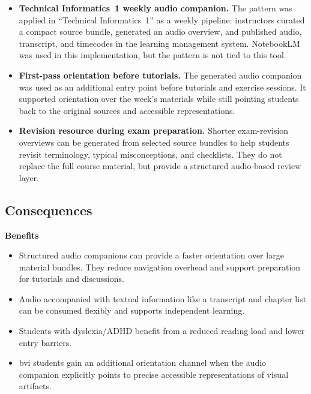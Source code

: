 \begin{itemize}
    \item \textbf{Technical Informatics~1 weekly audio companion.}
    The pattern was applied in ``Technical Informatics~1'' as a weekly pipeline: instructors curated a compact source bundle, generated an audio overview, and published audio, transcript, and timecodes in the learning management system. NotebookLM was used in this implementation, but the pattern is not tied to this tool.

    \item \textbf{First-pass orientation before tutorials.}
    The generated audio companion was used as an additional entry point before tutorials and exercise sessions. It supported orientation over the week's materials while still pointing students back to the original sources and accessible representations.

    \item \textbf{Revision resource during exam preparation.}
    Shorter exam-revision overviews can be generated from selected source bundles to help students revisit terminology, typical misconceptions, and checklists. They do not replace the full course material, but provide a structured audio-based review layer.
\end{itemize}

\subsection*{Consequences}

\noindent\textbf{Benefits}
\begin{itemize}
    \item[$+$] Structured audio companions can provide a faster orientation over large material bundles. They reduce navigation overhead and support preparation for tutorials and discussions.
    \item[$+$] Audio accompanied with textual information like a transcript and chapter list can be consumed flexibly and supports independent learning.
    \item[$+$] Students with dyslexia/ADHD benefit from a reduced reading load and lower entry barriers.
    \item[$+$] \ac{bvi} students gain an additional orientation channel when the audio companion explicitly points to precise accessible representations of visual artifacts.
\end{itemize}

